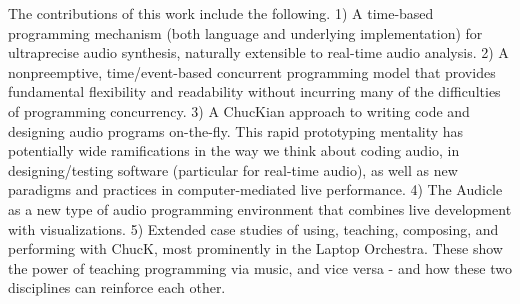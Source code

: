 The contributions of this work include the following. 1) A time-based programming 
mechanism (both language and underlying implementation) for ultraprecise audio 
synthesis, naturally extensible to real-time audio analysis. 2) A nonpreemptive, 
time/event-based concurrent programming model that provides fundamental flexibility 
and readability without incurring many of the difficulties of
programming concurrency. 3) A ChucKian approach to writing code and designing audio 
programs on-the-fly. This rapid prototyping mentality has potentially
wide ramifications in the way we think about coding audio, in designing/testing
software (particular for real-time audio), as well as new paradigms and practices
in computer-mediated live performance. 4) The Audicle as a new type of audio
programming environment that combines live development with visualizations. 5)
Extended case studies of using, teaching, composing, and performing with ChucK,
most prominently in the Laptop Orchestra. These show the power of teaching programming 
via music, and vice versa - and how these two disciplines can reinforce
each other.